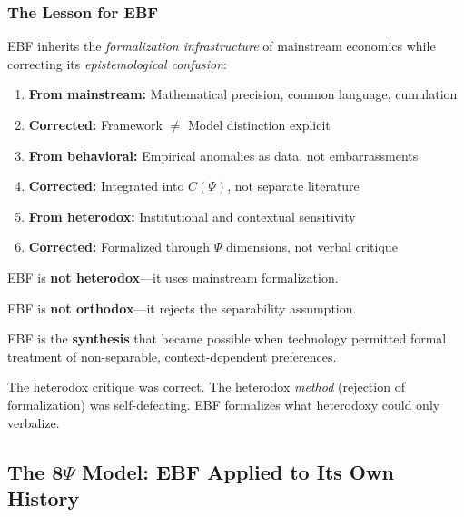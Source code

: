 \subsubsection{The Lesson for EBF}

EBF inherits the \textit{formalization infrastructure} of mainstream economics
while correcting its \textit{epistemological confusion}:

\begin{enumerate}[nosep]
    \item \textbf{From mainstream:} Mathematical precision, common language, cumulation
    \item \textbf{Corrected:} Framework $\neq$ Model distinction explicit
    \item \textbf{From behavioral:} Empirical anomalies as data, not embarrassments
    \item \textbf{Corrected:} Integrated into $C(\Psi)$, not separate literature
    \item \textbf{From heterodox:} Institutional and contextual sensitivity
    \item \textbf{Corrected:} Formalized through $\Psi$ dimensions, not verbal critique
\end{enumerate}

\begin{tcolorbox}[colback=blue!5!white, colframe=blue!75!black,
    title=\textbf{EBF's Position}]

EBF is \textbf{not heterodox}---it uses mainstream formalization.

EBF is \textbf{not orthodox}---it rejects the separability assumption.

EBF is the \textbf{synthesis} that became possible when technology permitted
formal treatment of non-separable, context-dependent preferences.

The heterodox critique was correct. The heterodox \textit{method} (rejection
of formalization) was self-defeating. EBF formalizes what heterodoxy could
only verbalize.
\end{tcolorbox}



\subsection{The 8$\Psi$ Model: EBF Applied to Its Own History}
\label{sec:meta-8psi-model}

